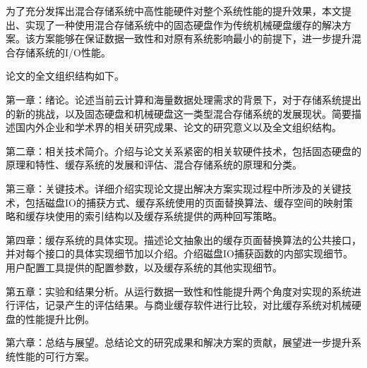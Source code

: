 为了充分发挥出混合存储系统中高性能硬件对整个系统性能的提升效果，本文提出、实现了一种使用混合存储系统中的固态硬盘作为传统机械硬盘缓存的解决方案。该方案能够在保证数据一致性和对原有系统影响最小的前提下，进一步提升混合存储系统的I/O性能。

论文的全文组织结构如下。

第一章：绪论。论述当前云计算和海量数据处理需求的背景下，对于存储系统提出的新的挑战，以及固态硬盘和机械硬盘这一类型混合存储系统的发展现状。简要描述国内外企业和学术界的相关研究成果、论文的研究意义以及全文组织结构。

第二章：相关技术简介。介绍与论文关系紧密的相关软硬件技术，包括固态硬盘的原理和特性、缓存系统的发展和评估、混合存储系统的原理和分类。

第三章：关键技术。详细介绍实现论文提出解决方案实现过程中所涉及的关键技术，包括磁盘IO的捕获方式、缓存系统使用的页面替换算法、缓存空间的映射策略和缓存块使用的索引结构以及缓存系统提供的两种回写策略。

第四章：缓存系统的具体实现。描述论文抽象出的缓存页面替换算法的公共接口，并对每个接口的具体实现细节加以介绍。介绍磁盘IO捕获函数的内部实现细节。用户配置工具提供的配置参数，以及缓存系统的其他实现细节。

第五章：实验和结果分析。从运行数据一致性和性能提升两个角度对实现的系统进行评估，记录产生的评估结果。与商业缓存软件进行比较，对比缓存系统对机械硬盘的性能提升比例。

第六章：总结与展望。总结论文的研究成果和解决方案的贡献，展望进一步提升系统性能的可行方案。

